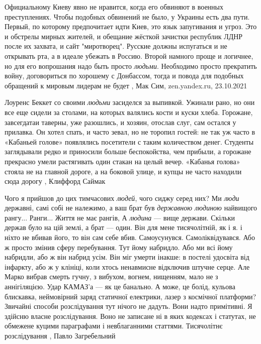 Официальному Киеву явно не нравится, когда его обвиняют в военных
преступлениях. Чтобы подобных обвинений не было, у Украины есть два пути.
Первый, по которому предпочитает идти Киев, это язык запугивания и угроз. Это и
обстрелы мирных жителей, и обещание жёсткой зачистки республик ЛДНР после их
захвата, и сайт "миротворец". Русские должны испугаться и не открывать рта, а в
идеале убежать в Россию.  Второй намного проще и логичнее, но для его
вопрошания надо быть просто \emph{людьми}. Необходимо просто прекратить войну,
договориться по хорошему с Донбассом, тогда и повода для подобных обращений к
мировым лидерам не будет
, Мак Сим, zen.yandex.ru, 23.10.2021

Лоуренс Беккет со своими \emph{людьми} засиделся за выпивкой. Ужинали рано, но они все
еще сидели за столами, на которых валялись кости и куски хлеба. Горожане,
завсегдатаи таверны, уже разошлись, и хозяин, отослав слуг, сам остался у
прилавка. Он хотел спать, и часто зевал, но не торопил гостей: не так уж часто
в «Кабаньей голове» появлялись посетители с таким количеством денег. Студенты
заглядывали редко и приносили больше беспокойства, чем прибыли, а горожане
прекрасно умели растягивать один стакан на целый вечер. «Кабанья голова» стояла
не на главной дороге, а на боковой улице, и купцы не часто находили сюда дорогу
, Клиффорд Саймак

Чого я прийшов до цих тимчасових \emph{людей}, чого сиджу серед них? Ми \emph{люди} державні,
самі собі не належимо, а ваш брат був \emph{державною людиною} найвищого рангу... Ранги...
Життя не має рангів, А \emph{людина} — вище держави. Скільки держав було на цій землі,
а брат — один. Він для мене тисячолітній, як і я. і ніхто не вбивав його, то
він сам себе вбив. Самоусунувся. Самоліквідувався. Або ж просто змінив сферу
перебування. Тут йому набридло. Або ми всі йому набридли, або ж він набрид
усім. Він міг умерти інакше: в постелі удосвіта від інфаркту, або ж у клініці,
коли хтось ненавмисне відключив штучне серце. Але Марко вибрав смерть гучну, з
вибухом, вогнем, нищенням, мало не з аннігіляцією. Удар КАМАЗ’а — як це
банально. А може, це болід, кульова блискавка, неймовірний заряд статичної
електрики, лазер з космічної платформи? Звичайні способи розслідування тут
нічого не дадуть. Вони надто примітивні. Я здійсню власне розслідування. Воно
не записане ні в яких кодексах і статутах, не обмежене куцими параграфами і
невблаганними статтями. Тисячолітнє розслідування
, Павло Загребельний 

